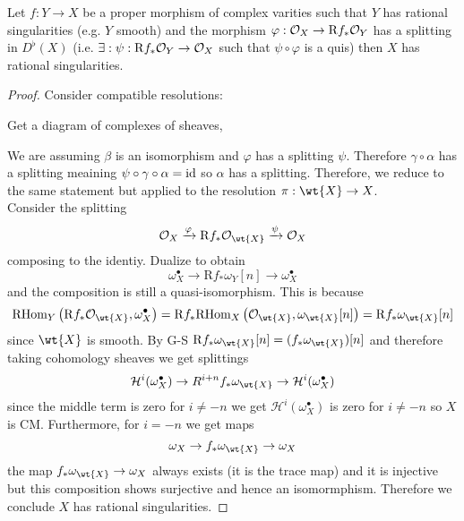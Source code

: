 \documentclass[12pt]{article}
\newcommand{\R}{\mathrm{R}}
\renewcommand{\cH}{\mathcal{H}}
\begin{document}
\begin{theorem}[Kov\'{a}cs]
Let $f : Y \to X$ be a proper morphism of complex varities such that $Y$ has rational singularities (e.g. $Y$ smooth) and the morphism $\varphi : \struct{X} \to \R f_* \struct{Y}$ has a splitting in $D^\flat(X)$ (i.e. $\exists : \psi : \R f_* \struct{Y} \to \struct{X}$ such that $\psi \circ \varphi$ is a quis) then $X$ has rational singularities. 
\end{theorem}

\begin{proof}
Consider compatible resolutions:
\begin{center}
\end{center}
Get a diagram of complexes of sheaves,
\begin{center}
\end{center}
We are assuming $\beta$ is an isomorphism and $\varphi$ has a splitting $\psi$. Therefore $\gamma \circ \alpha$ has a splitting meaining $\psi \circ \gamma \circ \alpha = \mathrm{id}$ so $\alpha$ has a splitting. Therefore, we reduce to the same statement but applied to the resolution $\pi : \wt{X} \to X$. 
\bigskip\\
Consider the splitting
\[ \struct{X} \xrightarrow{\varphi} \R f_* \struct{\wt{X}} \xrightarrow{\psi} \struct{X} \]
composing to the identiy. Dualize to obtain
\[ \omega_X^\bullet \to \R f_* \omega_Y[n] \to \omega_X^\bullet \]
and the composition is still a quasi-isomorphism. This is because
\[ \RHom{Y}{\R f_* \struct{\wt{X}}}{\omega_X^\bullet} = \R f_* \RHom{X}{\struct{\wt{X}}}{\omega_{\wt{X}}[n]} = \R f_* \omega_{\wt{X}} [n] \]
since $\wt{X}$ is smooth. By G-S $\R f_* \omega_{\wt{X}}[n] = (f_* \omega_{\wt{X}})[n]$ and therefore taking cohomology sheaves we get splittings
\[ \cH^i(\omega_X^\bullet) \to R^{i+n} f_* \omega_{\wt{X}} \to \cH^i(\omega_X^\bullet) \]
since the middle term is zero for $i \neq -n$ we get $\cH^i(\omega_X^\bullet)$ is zero for $i \neq -n$ so $X$ is CM. Furthermore, for $i = -n$ we get maps
\[ \omega_X \to f_* \omega_{\wt{X}} \to \omega_X \] 
the map $f_* \omega_{\wt{X}} \to \omega_X$ always exists (it is the trace map) and it is injective but this composition shows surjective and hence an isomormphism. Therefore we conclude $X$ has rational singularities. 
\end{proof}
\end{document}
